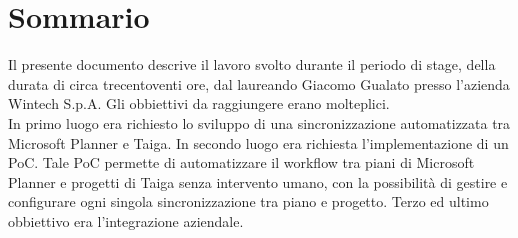 \cleardoublepage
{}
{}
\begingroup
\let\clearpage\relax
\let\cleardoublepage\relax
\let\cleardoublepage\relax

\chapter*{Sommario}

Il presente documento descrive il lavoro svolto durante il periodo di stage, della durata di circa trecentoventi ore, dal laureando Giacomo Gualato presso l'azienda Wintech S.p.A.
Gli obbiettivi da raggiungere erano molteplici.\\
In primo luogo era richiesto lo sviluppo di una sincronizzazione automatizzata tra Microsoft Planner e Taiga.
In secondo luogo era richiesta l'implementazione di un PoC.
Tale PoC permette di automatizzare il workflow tra piani di Microsoft Planner e progetti di Taiga senza intervento umano, con la 
possibilità di gestire e configurare ogni singola sincronizzazione tra piano e progetto. 
Terzo ed ultimo obbiettivo era l'integrazione aziendale.




\endgroup

\vfill
